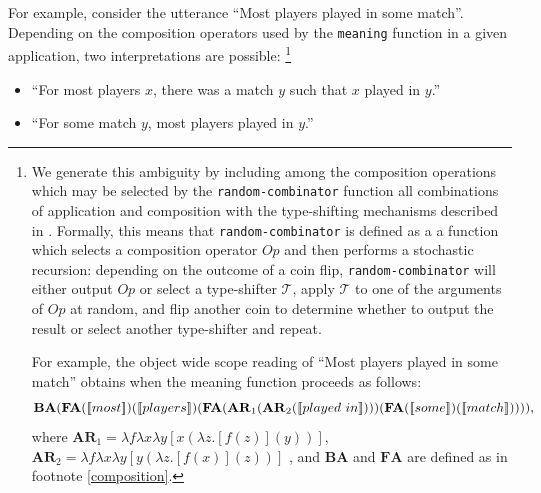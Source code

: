 \documentclass[12pt]{article}
\newcommand{\llbracket}{\ensuremath{\left [\!\left [}}%
\newcommand{\rrbracket}{\ensuremath{\right ]\!\right ]}}
\providecommand{\sv}[1]{\ensuremath{\llbracket #1 \rrbracket}}
\begin{document}
For example, consider the utterance ``Most players played in some match''. 
Depending on the composition operators used by the \lstinline{meaning} function in a given application, two interpretations are possible:
\footnote{
We generate this ambiguity by including among the composition operations which may be selected by the \lstinline{random-combinator} function all combinations of application and composition with the type-shifting mechanisms described in \citet{hendriks93,barker05}.
Formally, this means that \lstinline{random-combinator} is defined as a a function which selects a composition operator $\mathit{Op}$ and then performs a stochastic recursion: depending on the outcome of a coin flip, \lstinline{random-combinator} will either output $\mathit{Op}$ or select a type-shifter $\mathcal{T}$, apply $\mathcal{T}$ to one of the arguments of $\mathit{Op}$ at random, and flip another coin to determine whether to output the result or select another type-shifter and repeat.

For example, the object wide scope reading of ``Most players played in some match'' obtains when the meaning function proceeds as follows: 
$$
\mathbf{BA}(\mathbf{FA}(\sv{most})(\sv{players})
(\mathbf{FA}(\mathbf{AR}_1(\mathbf{AR}_2(\sv{played\ in})))
(\mathbf{FA}(\sv{some})(\sv{match})))),
$$  
where $\mathbf{AR}_1 = \lambda f \lambda x \lambda y [x(\lambda z . [f(z)] (y))]$, $\mathbf{AR}_2 = \lambda f \lambda x \lambda y [y(\lambda z . [f(x)] (z))]$ \cite[cf.][pp.453ff.]{barker05}, and $\mathbf{BA}$ and $\mathbf{FA}$ are defined as in footnote \ref{composition}.
}
\begin{itemize}
\item ``For most players $x$, there was a match $y$ such that $x$ played in $y$.'' 
\item ``For some match $y$, most players played in $y$.''
\end{itemize}
\end{document}
